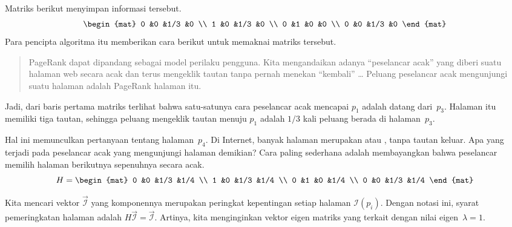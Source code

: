 Matriks berikut menyimpan informasi tersebut.
\begin{equation*}
  \begin{mat}
    0   &0  &1/3  &0   \\
    1   &0  &1/3  &0   \\
    0   &1  &0    &0 \\
    0   &0  &1/3  &0
  \end{mat}
\end{equation*}
Para pencipta algoritma itu memberikan cara berikut untuk memaknai matriks
tersebut.
\begin{quotation}
PageRank dapat dipandang sebagai model perilaku pengguna. Kita mengandaikan
adanya ``peselancar acak'' yang diberi suatu halaman web secara acak dan terus
mengeklik tautan tanpa pernah menekan ``kembali'' \ldots{}
Peluang peselancar acak mengunjungi suatu halaman adalah PageRank halaman itu.
\cite{BrinPage}
\end{quotation}
Jadi, dari baris pertama matriks terlihat bahwa satu-satunya cara peselancar
acak mencapai $p_1$ adalah datang dari~$p_3$. Halaman itu memiliki tiga tautan,
sehingga peluang mengeklik tautan menuju $p_1$ adalah $1/3$ kali peluang berada
di halaman~$p_3$.

Hal ini memunculkan pertanyaan tentang halaman~$p_4$. Di Internet, banyak
halaman merupakan %
 atau
,
tanpa tautan keluar. Apa yang terjadi pada peselancar acak yang mengunjungi
halaman demikian? Cara paling sederhana adalah membayangkan bahwa peselancar
memilih halaman berikutnya sepenuhnya secara acak.
\begin{equation*}
  H=\begin{mat}
    0   &0  &1/3  &1/4   \\
    1   &0  &1/3  &1/4   \\
    0   &1  &0    &1/4 \\
    0   &0  &1/3  &1/4
  \end{mat}
\end{equation*}

Kita mencari vektor $\vec{\mathcal{I}}$ yang komponennya merupakan peringkat
kepentingan setiap halaman $\mathcal{I}(p_i)$. Dengan notasi ini, syarat
pemeringkatan halaman adalah $H\vec{\mathcal{I}}=\vec{\mathcal{I}}$. Artinya,
kita menginginkan vektor eigen matriks yang terkait dengan nilai
eigen~$\lambda=1$.

